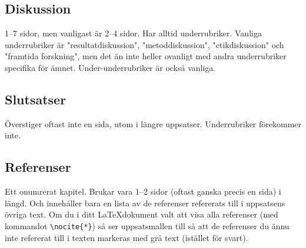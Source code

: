 \subsection{Diskussion}
\label{rubrik.diskussion}

1--7 sidor, men vanligast är 2--4 sidor. Har alltid underrubriker. Vanliga
underrubriker är "resultatdiskussion", "metoddiskussion", "etikdiskussion" och
"framtida forskning", men det än inte heller ovanligt med andra underrubriker
specifika för ämnet. Under-underrubriker är också vanliga.


\subsection{Slutsatser}
\label{rubrik.slutsats}

Överstiger oftast inte en sida, utom i längre uppsatser. Underrubriker
förekommer inte.


\subsection{Referenser}
\label{rubrik.referenser}

Ett onumrerat kapitel. Brukar vara 1--2 sidor (oftast ganska precis en sida) i
längd. Och innehåller bara en lista av de referenser refererats till i
uppsatsens övriga text. Om du i ditt \LaTeX dokument valt att visa alla
referenser (med kommandot \verb|\nocite{*}|) så ser uppsatsmallen till så att
de referenser du ännu inte refererat till i texten markeras med grå text
(istället för svart).

